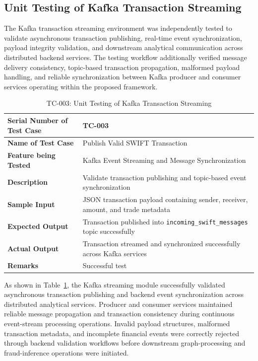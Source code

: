 \subsection[Unit Testing of Kafka Transaction Streaming]{\textbf{Unit Testing of Kafka Transaction Streaming}}

The Kafka transaction streaming environment was independently tested to validate asynchronous transaction publishing, real-time event synchronization, payload integrity validation, and downstream analytical communication across distributed backend services. The testing workflow additionally verified message delivery consistency, topic-based transaction propagation, malformed payload handling, and reliable synchronization between Kafka producer and consumer services operating within the proposed framework.


\begin{table}[H]
\centering
\caption{TC-003: Unit Testing of Kafka Transaction Streaming}
\label{tab:kafka_test}
\vspace{0.2cm}

\begin{tabular}{|p{4.2cm}|p{9cm}|}
\hline
\textbf{Serial Number of Test Case} & TC-003 \\ \hline
\textbf{Name of Test Case} & Publish Valid SWIFT Transaction \\ \hline
\textbf{Feature being Tested} & Kafka Event Streaming and Message Synchronization \\ \hline
\textbf{Description} & Validate transaction publishing and topic-based event synchronization \\ \hline
\textbf{Sample Input} & JSON transaction payload containing sender, receiver, amount, and trade metadata \\ \hline
\textbf{Expected Output} & Transaction published into \texttt{incoming\_swift\_messages} topic successfully \\ \hline
\textbf{Actual Output} & Transaction streamed and synchronized successfully across Kafka services \\ \hline
\textbf{Remarks} & Successful test \\ \hline
\end{tabular}
\end{table}

As shown in Table~\ref{tab:kafka_test}, the Kafka streaming module successfully validated asynchronous transaction publishing and backend event synchronization across distributed analytical services. Producer and consumer services maintained reliable message propagation and transaction consistency during continuous event-stream processing operations. Invalid payload structures, malformed transaction metadata, and incomplete financial events were correctly rejected through backend validation workflows before downstream graph-processing and fraud-inference operations were initiated.

